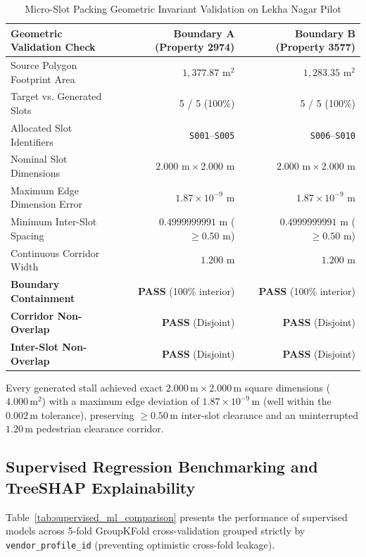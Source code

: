 \begin{table}[htbp]
\caption{Micro-Slot Packing Geometric Invariant Validation on Lekha Nagar Pilot}
\label{tab:slot_geometric_validation}
\centering
\small
\begin{tabular}{lrr}
\toprule
\textbf{Geometric Validation Check} & \textbf{Boundary A (Property 2974)} & \textbf{Boundary B (Property 3577)} \\
\midrule
Source Polygon Footprint Area & $1,377.87\text{ m}^2$ & $1,283.35\text{ m}^2$ \\
Target vs. Generated Slots & 5 / 5 (100\%) & 5 / 5 (100\%) \\
Allocated Slot Identifiers & \texttt{S001}--\texttt{S005} & \texttt{S006}--\texttt{S010} \\
\midrule
Nominal Slot Dimensions & $2.000\text{ m} \times 2.000\text{ m}$ & $2.000\text{ m} \times 2.000\text{ m}$ \\
Maximum Edge Dimension Error & \textbf{$1.87 \times 10^{-9}\text{ m}$} & \textbf{$1.87 \times 10^{-9}\text{ m}$} \\
Minimum Inter-Slot Spacing & $0.4999999991\text{ m}$ ($\ge 0.50\text{ m}$) & $0.4999999991\text{ m}$ ($\ge 0.50\text{ m}$) \\
Continuous Corridor Width & $1.200\text{ m}$ & $1.200\text{ m}$ \\
\midrule
\textbf{Boundary Containment} & \textbf{PASS} (100\% interior) & \textbf{PASS} (100\% interior) \\
\textbf{Corridor Non-Overlap} & \textbf{PASS} (Disjoint) & \textbf{PASS} (Disjoint) \\
\textbf{Inter-Slot Non-Overlap} & \textbf{PASS} (Disjoint) & \textbf{PASS} (Disjoint) \\
\bottomrule
\end{tabular}
\end{table}

Every generated stall achieved exact $2.000\,\text{m} \times 2.000\,\text{m}$ square dimensions ($4.000\,\text{m}^2$) with a maximum edge deviation of $1.87 \times 10^{-9}\,\text{m}$ (well within the $0.002\,\text{m}$ tolerance), preserving $\ge 0.50\,\text{m}$ inter-slot clearance and an uninterrupted $1.20\,\text{m}$ pedestrian clearance corridor.

\subsection{Supervised Regression Benchmarking and TreeSHAP Explainability}
Table~\ref{tab:supervised_ml_comparison} presents the performance of supervised models across 5-fold GroupKFold cross-validation grouped strictly by \texttt{vendor\_profile\_id} (preventing optimistic cross-fold leakage).

